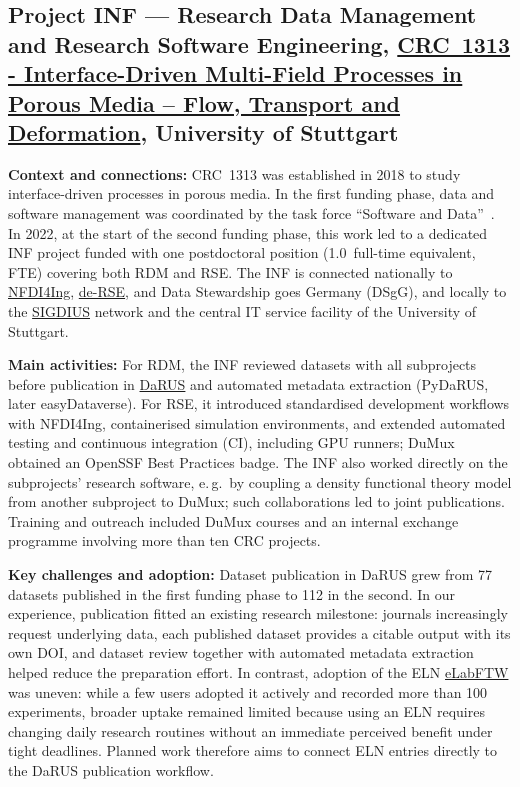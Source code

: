 \documentclass{eceasst}
\newcommand{\eg}{e.\,g.}
\newcommand{\elabftw}{\href{https://www.elabftw.net/}{eLabFTW}}
\begin{document}
\subsection{Project INF --- Research Data Management and Research Software Engineering, \href{https://gepris.dfg.de/gepris/projekt/327154368}{CRC~1313 - Interface-Driven Multi-Field Processes in Porous Media – Flow, Transport and Deformation}, University of Stuttgart}
\label{subsec:crc1313}
\noindent\textbf{Context and connections:}
CRC~1313 was established in 2018 to study interface-driven processes in porous media.
In the first funding phase, data and software management was coordinated by the task force ``Software and Data''~\cite{Schneider2020SFB1313}.
In 2022, at the start of the second funding phase, this work led to a dedicated INF project funded with one postdoctoral position (1.0~full-time equivalent, FTE) covering both RDM and RSE.
The INF is connected nationally to \href{https://nfdi4ing.de/}{NFDI4Ing}, \href{https://de-rse.org}{de-RSE}, and Data Stewardship goes Germany (DSgG), and locally to the \href{https://www.simtech.uni-stuttgart.de/communication/events/workshops/sigdius-seminars/}{SIGDIUS} network and the central IT service facility of the University of Stuttgart.

\medskip
\noindent\textbf{Main activities:}
For RDM, the INF reviewed datasets with all subprojects before publication in \href{https://darus.uni-stuttgart.de/}{DaRUS} and automated metadata extraction (PyDaRUS, later easyDataverse).
For RSE, it introduced standardised development workflows with NFDI4Ing, containerised simulation environments, and extended automated testing and continuous integration (CI), including GPU runners; DuMux obtained an OpenSSF Best Practices badge.
The INF also worked directly on the subprojects' research software, \eg~by coupling a density functional theory model from another subproject to DuMux; such collaborations led to joint publications.
Training and outreach included DuMux courses and an internal exchange programme involving more than ten CRC projects.

\medskip
\noindent\textbf{Key challenges and adoption:}
Dataset publication in DaRUS grew from 77 datasets published in the first funding phase to 112 in the second.
In our experience, publication fitted an existing research milestone: journals increasingly request underlying data, each published dataset provides a citable output with its own DOI, and dataset review together with automated metadata extraction helped reduce the preparation effort.
In contrast, adoption of the ELN \elabftw{} was uneven: while a few users adopted it actively and recorded more than 100 experiments, broader uptake remained limited because using an ELN requires changing daily research routines without an immediate perceived benefit under tight deadlines.
Planned work therefore aims to connect ELN entries directly to the DaRUS publication workflow.
\end{document}
